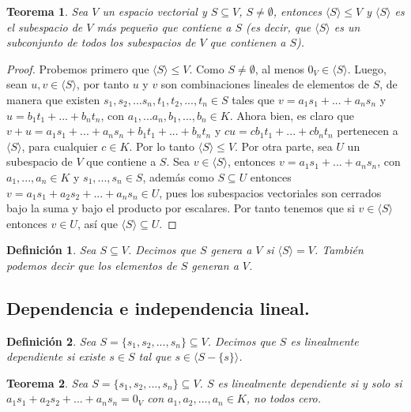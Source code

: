 \documentclass{book}
\newtheorem{theorem}{Teorema}
\newtheorem{definition}{Definición}
\begin{document}
\begin{theorem}
Sea $V$ un espacio vectorial y $S \subseteq V$, $S \neq \emptyset$, entonces $\langle S \rangle \leq V$ y $\langle S \rangle$ es el subespacio de $V$ más pequeño que contiene a $S$ (es decir, que $\langle S \rangle$ es un subconjunto de todos los subespacios de $V$ que contienen a $S$).
\end{theorem}
\begin{proof}
Probemos primero que $\langle S \rangle \leq V$. Como $S \neq \emptyset$, al menos $0_V \in \langle S \rangle$. Luego, sean $u,v \in \langle S \rangle$, por tanto $u$ y $v$ son combinaciones lineales de elementos de $S$, de manera que existen $s_1,s_2,...s_n,t_1,t_2,...,t_n \in S$ tales que $v=a_1s_1+...+a_ns_n$ y $u=b_1t_1+...+b_nt_n$, con $a_1,...a_n,b_1,...,b_n \in K$. Ahora bien, es claro que $v+u=a_1s_1+...+a_ns_n+b_1t_1+...+b_nt_n$ y $cu=cb_1t_1+...+cb_nt_n$ pertenecen a $\langle S \rangle$, para cualquier $c \in K$. Por lo tanto $\langle S \rangle \leq V$.\newline \newline
Por otra parte, sea $U$ un subespacio de $V$ que contiene a $S$. Sea $v \in \langle S \rangle$, entonces $v=a_1s_1+...+a_ns_n$, con $a_1,...,a_n \in K$ y $s_1,...,s_n \in S$, además como $S \subseteq U$ entonces $v=a_1s_1+a_2s_2+...+a_ns_n \in U$, pues los subespacios vectoriales son cerrados bajo la suma y bajo el producto por escalares. Por tanto tenemos que si $v \in \langle S \rangle$ entonces $v \in U$, así que $\langle S \rangle \subseteq U$.
\end{proof}

\begin{definition}
Sea $S \subseteq V$. Decimos que $S$ genera a $V$ si $\langle S \rangle = V$. También podemos decir que los elementos de $S$ generan a $V$.
\end{definition}

\subsection{Dependencia e independencia lineal.}

\begin{definition}
Sea $S=\{s_1,s_2,...,s_n\}\subseteq V$. Decimos que $S$ es linealmente dependiente si existe $s \in S$ tal que $s \in \langle S-\{s\} \rangle$.
\end{definition}

\begin{theorem}
Sea $S=\{s_1,s_2,...,s_n\}\subseteq V$. $S$ es linealmente dependiente si y solo si $a_1s_1+a_2s_2+...+a_ns_n=0_V$ con $a_1,a_2,...,a_n \in K$, no todos cero.
\end{theorem}
\end{document}
